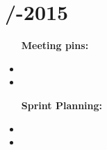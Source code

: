 \section{\logtitle /-2015} %
\attend{\at}{\at}{\at}{\at}


\begin{itemize}
	\item [\textbf{Meeting pins:}]
	\item
	\item 
\end{itemize}

\begin{itemize}
	\item [\textbf{Sprint Planning:}]
	\item
	\item 
\end{itemize}
